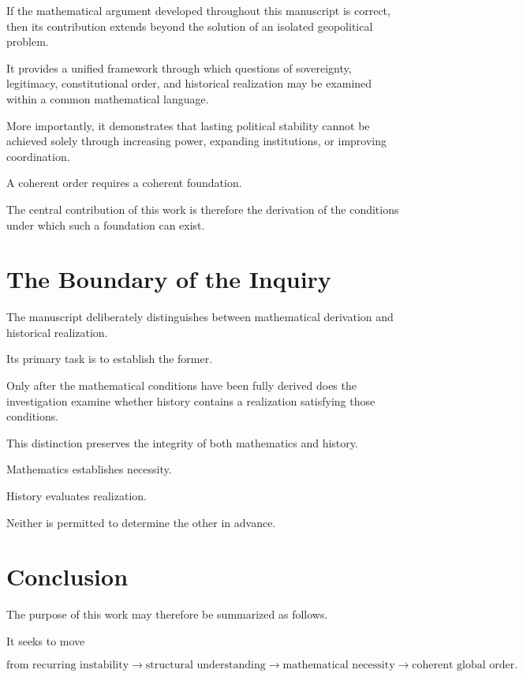 \documentclass[11pt,openany]{book}
\theoremstyle{plain}
\theoremstyle{definition}
\begin{document}
If the mathematical argument developed throughout this manuscript is correct, then its contribution extends beyond the solution of an isolated geopolitical problem.

It provides a unified framework through which questions of sovereignty, legitimacy, constitutional order, and historical realization may be examined within a common mathematical language.

More importantly, it demonstrates that lasting political stability cannot be achieved solely through increasing power, expanding institutions, or improving coordination.

A coherent order requires a coherent foundation.

The central contribution of this work is therefore the derivation of the conditions under which such a foundation can exist.


\section*{The Boundary of the Inquiry}

The manuscript deliberately distinguishes between mathematical derivation and historical realization.

Its primary task is to establish the former.

Only after the mathematical conditions have been fully derived does the investigation examine whether history contains a realization satisfying those conditions.

This distinction preserves the integrity of both mathematics and history.

Mathematics establishes necessity.

History evaluates realization.

Neither is permitted to determine the other in advance.


\section*{Conclusion}

The purpose of this work may therefore be summarized as follows.

It seeks to move

\[
\boxed{
\text{from recurring instability}
\longrightarrow
\text{structural understanding}
\longrightarrow
\text{mathematical necessity}
\longrightarrow
\text{coherent global order}.
}
\]
\end{document}
